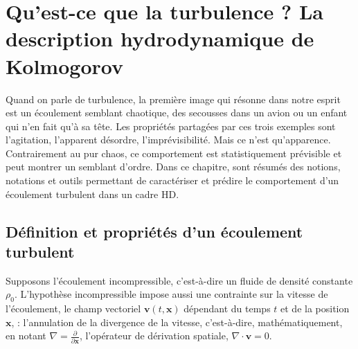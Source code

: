 \chapter{Qu'est-ce que la turbulence ? La description hydrodynamique de Kolmogorov}
\renewcommand\partie{\Partie\ Chapitre \thechapter}
\label{ch-01}

\minitoc  

\bigskip


Quand on parle de turbulence, la première image qui résonne dans notre esprit est un écoulement semblant chaotique, des secousses dans un avion ou un enfant qui n'en fait qu'à sa tête. Les propriétés partagées par ces trois exemples sont l'agitation, l'apparent désordre, l'imprévisibilité. Mais ce n'est qu'apparence. Contrairement au pur chaos, ce comportement est statistiquement prévisible et peut montrer un semblant d'ordre.  Dans ce chapitre, sont résumés des notions, notations et outils permettant de caractériser et prédire le comportement d'un écoulement turbulent dans un cadre \ac{HD}. 

\section{Définition et propriétés d'un écoulement turbulent}\label{sec-011}

Supposons l'écoulement incompressible, c'est-à-dire un fluide de densité constante $\rho_0$. L'hypothèse incompressible impose aussi une contrainte sur la vitesse de l'écoulement, le champ vectoriel $\boldsymbol{v}(t,\mathbf{x})$ dépendant du temps $t$ et de la position $\mathbf{x}$, : l'annulation de la divergence de la vitesse, c'est-à-dire, mathématiquement, en notant $\nabla = \frac{\partial}{\partial \mathbf{x}}$, l'opérateur de dérivation spatiale, $\nabla \cdot \boldsymbol{v}  = 0$. 

